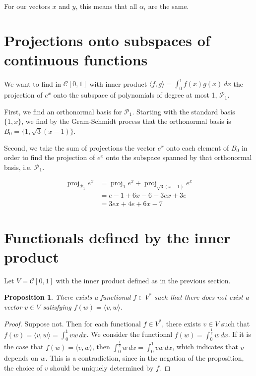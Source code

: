 \documentclass{article}
\newtheorem{proposition}{Proposition}
\DeclareMathOperator{\proj}{proj}
\begin{document}
For our vectors $x$ and $y$, this means that all $\alpha_i$ are the same.


\section{Projections onto subspaces of continuous functions}

We want to find in $\mathcal{C}[0, 1]$ with inner product
$\langle f, g \rangle = \int_0^1 f(x)g(x)\, dx$ the projection of $e^x$ onto
the subspace of polynomials of degree at most 1, $\mathcal{P}_1$.

First, we find an orthonormal basis for $\mathcal{P}_1$.
Starting with the standard basis $\{1, x\}$, we find by the
Gram-Schmidt process that the orthonormal basis is
$B_0 = \{1, \sqrt{3}(x - 1)\}$.

Second, we take the sum of projections the vector $e^x$ onto each element of
$B_0$ in order to find the projection of $e^x$ onto the
subspace spanned by that orthonormal basis, i.e. $\mathcal{P}_1$.

\begin{align*}
    \proj_{\mathcal{P}_1} {e^x} &= \proj_{1} {e^x} + \proj_{\sqrt{3} (x - 1)} {e^x} \\
                                &= e - 1 + 6 x - 6 - 3 e x + 3 e \\
                                &= 3 e x + 4 e + 6 x - 7
\end{align*}


\section{Functionals defined by the inner product}

Let $V = \mathcal{C}[0, 1]$ with the inner product defined as in the previous
section.

\begin{proposition}
    There exists a functional $f \in V^*$ such that there does not exist a
    vector $v \in V$ satisfying $f(w) = \langle v, w \rangle$.
\end{proposition}

\begin{proof}
    Suppose not. Then for each functional $f \in V^*$, there exists $v \in V$
    such that
    $f(w) = \langle v, w \rangle = \int_0^1 vw\, dx$.
    We consider the functional
    $f(w) = \int_0^{\frac{1}{2}} w\, dx$.
    If it is the case that
    $f(w) = \langle v, w \rangle$,
    then
    $\int_0^{\frac{1}{2}} w\, dx = \int_0^1 vw\, dx$,
    which indicates that $v$ depends on $w$.
    This is a contradiction, since in the negation of the proposition, the
    choice of $v$ should be uniquely determined by $f$.
\end{proof}
\end{document}
